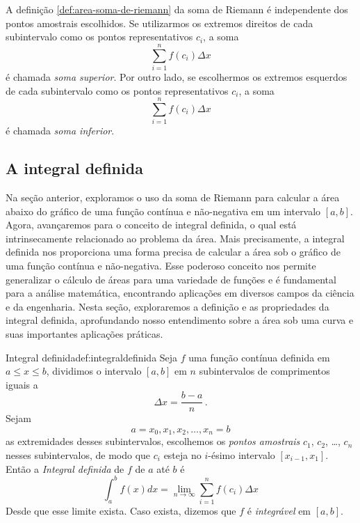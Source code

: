 A definição \ref{def:area-soma-de-riemann} da soma de Riemann é independente
dos pontos amostrais escolhidos. Se utilizarmos os extremos direitos de
cada subintervalo como os pontos representativos $c_i$, a soma
\[
  \sum_{i=1}^n f(c_i) \Delta x
\]
é chamada \textit{soma superior}.
Por outro lado, se escolhermos os extremos esquerdos de cada subintervalo
como os pontos representativos $c_i$, a soma
\[
  \sum_{i=1}^n f(c_i) \Delta x
\]
é chamada \textit{soma inferior}.

\subsection{A integral definida}

Na seção anterior, exploramos o uso da soma de Riemann para calcular a área
abaixo do gráfico de uma função contínua e não-negativa em um intervalo
$[a, b]$. Agora, avançaremos para o conceito de integral definida, o qual está
intrinsecamente relacionado ao problema da área. Mais precisamente, a integral
definida nos proporciona uma forma precisa de calcular a área sob o gráfico de
uma função contínua e não-negativa. Esse poderoso conceito nos permite
generalizar o cálculo de áreas para uma variedade de funções e é fundamental
para a análise matemática, encontrando aplicações em diversos campos da ciência
e da engenharia. Nesta seção, exploraremos a definição e as propriedades da
integral definida, aprofundando nosso entendimento sobre a área sob uma curva e
suas importantes aplicações práticas.

\begin{definicao}{Integral definida}{def:integraldefinida}
  Seja $f$ uma função contínua definida em $a \leq x \leq b$, dividimos o
  intervalo $[a, b]$ em $n$ subintervalos de comprimentos iguais a
  \[
    \Delta x= \frac{b-a}{n} \,.
  \]
  Sejam
  \[
    a = x_0, x_1, x_2, \dots, x_n = b
  \]
  as extremidades desses
  subintervalos, escolhemos os
  \emph{pontos amostrais}
  $c_1$, $c_2$, \dots, $c_n$ nesses
  subintervalos, de modo que $c_i$ esteja no $i$-ésimo intervalo $[x_{i-1},x_1]$.
  Então a
  \emph{Integral definida}
  de $f$ de $a$ até $b$ é
  \[
      \int_a^b f(x) dx
      = \lim_{n \to \infty} \sum_{i=1}^n f(c_i) \Delta x
  \]
  Desde que esse limite exista. Caso exista, dizemos que $f$ é
  \emph{integrável}
  em $[a, b]$.
\end{definicao}

